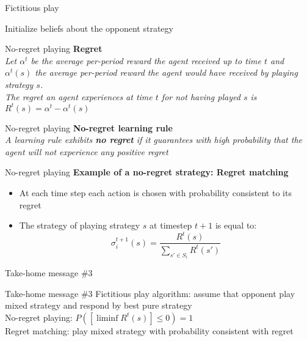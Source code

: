 \begin{frame}{Fictitious play}
    \begin{algorithm}[H]
         Initialize beliefs about the opponent strategy\;
    \caption{Fictitious play algorithm}
    \end{algorithm}
\end{frame}


\begin{frame}{No-regret playing}
    \textbf{Regret}\\
    \textit{Let $\alpha^t$ be the average per-period reward the agent received up to time $t$ and $\alpha^t(s)$ the average per-period reward the agent would have received by playing strategy $s$.}\\
    \textit{The regret an agent experiences at time $t$ for not having played $s$ is $R^t(s)=\alpha^t-\alpha^t(s)$}
\end{frame}

\begin{frame}{No-regret playing}
    \textbf{No-regret learning rule}\\
    \textit{A learning rule exhibits \textbf{no regret} if it guarantees with high probability that the agent will not experience any positive regret}
\end{frame}

\begin{frame}{No-regret playing}
    \textbf{Example of a no-regret strategy: Regret matching}\\
    \begin{itemize}
        \item At each time step each action is chosen with probability consistent to its regret
        \item The strategy of playing strategy $s$ at timestep $t+1$ is equal to:
        \[
            \sigma_i^{t+1}(s)= \frac{R^t(s)}{\sum_{s'\in S_i} R^t(s')}
        \]
    \end{itemize}
\end{frame}


\begin{frame}{Take-home message \#3}
    \begin{block}{Take-home message \#3}
        Fictitious play algorithm: assume that opponent play mixed strategy and respond by best pure strategy\\
        No-regret playing: $P([\liminf R^t(s)]\leq 0)=1$\\
        Regret matching: play mixed strategy with probability consistent with regret
    \end{block}
\end{frame}
